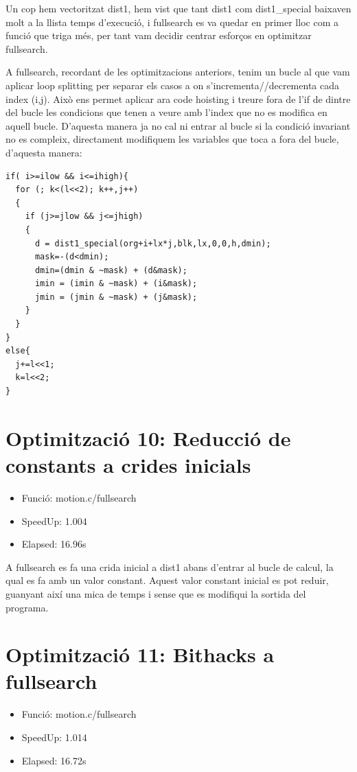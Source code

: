 Un cop hem vectoritzat dist1, hem vist que tant dist1 com dist1\_special baixaven molt a la llista temps d'execució, i fullsearch es va quedar en primer lloc com a funció que triga més, per tant vam decidir centrar esforços en optimitzar fullsearch.

A fullsearch, recordant de les optimitzacions anteriors, tenim un bucle al que vam aplicar loop splitting per separar els casos a on s'incrementa//decrementa cada index (i,j). Això ens permet aplicar ara code hoisting i treure fora de l'if de dintre del bucle les condicions que tenen a veure amb l'index que no es modifica en aquell bucle. D'aquesta manera ja no cal ni entrar al bucle si la condició invariant no es compleix, directament modifiquem les variables que toca a fora del bucle, d'aquesta manera:

\begin{lstlisting}
if( i>=ilow && i<=ihigh){
  for (; k<(l<<2); k++,j++)
  {
    if (j>=jlow && j<=jhigh)
    {
      d = dist1_special(org+i+lx*j,blk,lx,0,0,h,dmin);
      mask=-(d<dmin);
      dmin=(dmin & ~mask) + (d&mask);
      imin = (imin & ~mask) + (i&mask);
      jmin = (jmin & ~mask) + (j&mask);
    }
  } 
}
else{
  j+=l<<1;
  k=l<<2;	
}	 	
\end{lstlisting}

\section{Optimitzaci\'o 10: Reducci\'o de constants a crides inicials}
\begin{itemize}
\item{Funció: motion.c/fullsearch}
\item{SpeedUp: 1.004 }
\item{Elapsed: 16.96s}
\end{itemize}

A fullsearch es fa una crida inicial a dist1 abans d'entrar al bucle de calcul, la qual es fa amb un valor constant. Aquest valor constant inicial es pot reduir, guanyant així una mica de temps i sense que es modifiqui la sortida del programa.

\section{Optimitzaci\'o 11: Bithacks a fullsearch}
\begin{itemize}
\item{Funció: motion.c/fullsearch}
\item{SpeedUp:  1.014}
\item{Elapsed:  16.72s}
\end{itemize}

